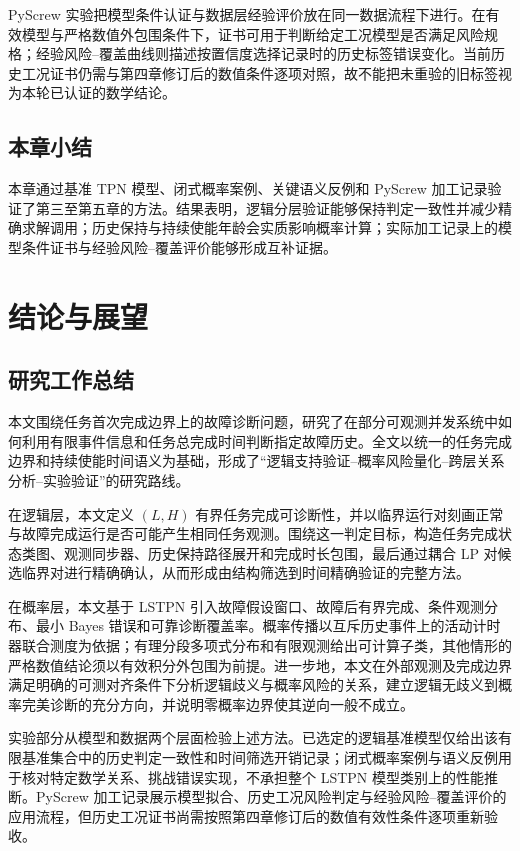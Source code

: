 \documentclass[master,fontset=ubuntu]{shnuthesis}
\theoremstyle{definition}
\begin{document}
PyScrew 实验把模型条件认证与数据层经验评价放在同一数据流程下进行。在有效模型与严格数值外包围条件下，证书可用于判断给定工况模型是否满足风险规格；经验风险--覆盖曲线则描述按置信度选择记录时的历史标签错误变化。当前历史工况证书仍需与第四章修订后的数值条件逐项对照，故不能把未重验的旧标签视为本轮已认证的数学结论。

\section{本章小结}

本章通过基准 TPN 模型、闭式概率案例、关键语义反例和 PyScrew 加工记录验证了第三至第五章的方法。结果表明，逻辑分层验证能够保持判定一致性并减少精确求解调用；历史保持与持续使能年龄会实质影响概率计算；实际加工记录上的模型条件证书与经验风险--覆盖评价能够形成互补证据。

\chapter{结论与展望}

\section{研究工作总结}

本文围绕任务首次完成边界上的故障诊断问题，研究了在部分可观测并发系统中如何利用有限事件信息和任务总完成时间判断指定故障历史。全文以统一的任务完成边界和持续使能时间语义为基础，形成了“逻辑支持验证--概率风险量化--跨层关系分析--实验验证”的研究路线。

在逻辑层，本文定义 \((L,H)\) 有界任务完成可诊断性，并以临界运行对刻画正常与故障完成运行是否可能产生相同任务观测。围绕这一判定目标，构造任务完成状态类图、观测同步器、历史保持路径展开和完成时长包围，最后通过耦合 LP 对候选临界对进行精确确认，从而形成由结构筛选到时间精确验证的完整方法。

在概率层，本文基于 LSTPN 引入故障假设窗口、故障后有界完成、条件观测分布、最小 Bayes 错误和可靠诊断覆盖率。概率传播以互斥历史事件上的活动计时器联合测度为依据；有理分段多项式分布和有限观测给出可计算子类，其他情形的严格数值结论须以有效积分外包围为前提。进一步地，本文在外部观测及完成边界满足明确的可测对齐条件下分析逻辑歧义与概率风险的关系，建立逻辑无歧义到概率完美诊断的充分方向，并说明零概率边界使其逆向一般不成立。

实验部分从模型和数据两个层面检验上述方法。已选定的逻辑基准模型仅给出该有限基准集合中的历史判定一致性和时间筛选开销记录；闭式概率案例与语义反例用于核对特定数学关系、挑战错误实现，不承担整个 LSTPN 模型类别上的性能推断。PyScrew 加工记录展示模型拟合、历史工况风险判定与经验风险--覆盖评价的应用流程，但历史工况证书尚需按照第四章修订后的数值有效性条件逐项重新验收。
\end{document}
